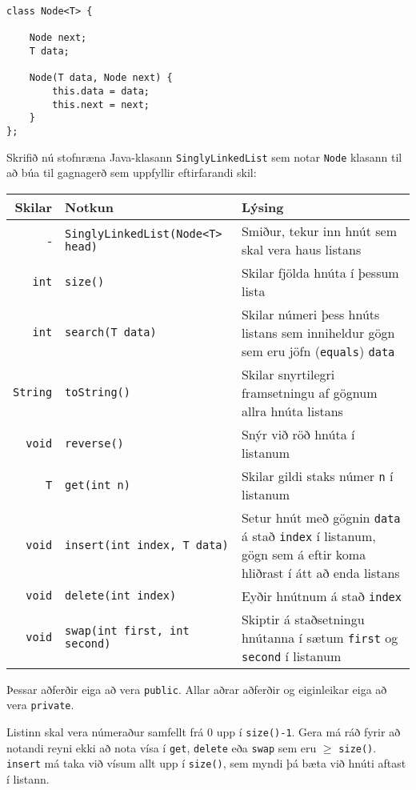 \documentclass{article}
\begin{document}
\begin{verbatim}
class Node<T> {

    Node next;
    T data;

    Node(T data, Node next) {
        this.data = data;
        this.next = next;
    }
};
\end{verbatim}

Skrifið nú stofnræna Java-klasann \texttt{SinglyLinkedList} sem notar \texttt{Node} klasann til að búa til gagnagerð sem uppfyllir eftirfarandi skil:

\begin{center}
\begin{tabularx}{\linewidth}{rlX}
\toprule
Skilar&Notkun&Lýsing\\
\midrule
-&\texttt{SinglyLinkedList(Node<T> head)}& Smiður, tekur inn hnút sem skal vera haus listans\\
\texttt{int}&\texttt{size()}&Skilar fjölda hnúta í þessum lista\\
\texttt{int}&\texttt{search(T data)}&Skilar númeri þess hnúts listans sem inniheldur gögn sem eru jöfn (\texttt{equals}) \texttt{data}\\
\texttt{String}&\texttt{toString()}&Skilar snyrtilegri framsetningu af gögnum allra hnúta listans\\
\texttt{void}&\texttt{reverse()}&Snýr við röð hnúta í listanum\\
\texttt{T}&\texttt{get(int n)}&Skilar gildi staks númer \texttt{n} í listanum\\
\texttt{void}&\texttt{insert(int index, T data)}&Setur hnút með gögnin \texttt{data} á stað \texttt{index} í listanum, gögn sem á eftir koma hliðrast í átt að enda listans\\
\texttt{void}&\texttt{delete(int index)}&Eyðir hnútnum á stað \texttt{index}\\
\texttt{void}&\texttt{swap(int first, int second)}&Skiptir á staðsetningu hnútanna í sætum \texttt{first} og \texttt{second} í listanum\\
\bottomrule
\end{tabularx}
\end{center}
Þessar aðferðir eiga að vera \texttt{public}. Allar aðrar aðferðir og eiginleikar eiga að vera \texttt{private}. 

Listinn skal vera númeraður samfellt frá $0$ upp í \texttt{size()-1}. Gera má ráð fyrir að notandi reyni ekki að nota vísa í \texttt{get}, \texttt{delete} eða \texttt{swap} sem eru $\geq$ \texttt{size()}. \texttt{insert} má taka við vísum allt upp í \texttt{size()}, sem myndi þá bæta við hnúti aftast í listann.
\end{document}

